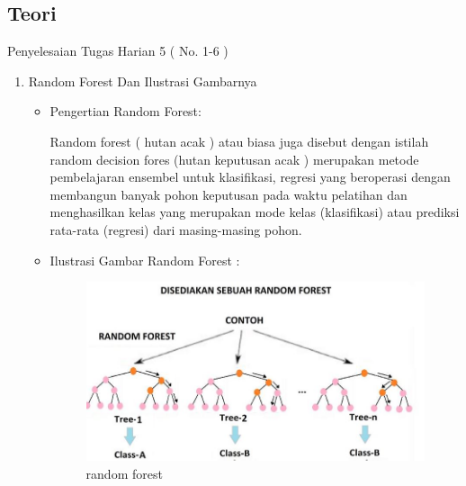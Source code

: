 \subsection{Teori}
Penyelesaian Tugas Harian 5 ( No. 1-6 )
\begin{enumerate}
\item Random Forest Dan Ilustrasi Gambarnya
\begin{itemize}
\item Pengertian Random Forest:
\par Random forest ( hutan acak ) atau biasa juga disebut dengan istilah random decision fores (hutan keputusan acak ) merupakan metode pembelajaran ensembel untuk klasifikasi, regresi yang beroperasi dengan membangun banyak pohon keputusan pada waktu pelatihan dan menghasilkan kelas yang merupakan mode kelas (klasifikasi) atau prediksi rata-rata (regresi) dari masing-masing pohon.
\item Ilustrasi Gambar Random Forest :
\par

\begin{figure}[ht]
\centering
\includegraphics[scale=0.2]{figures/random1.jpg}
\caption{random forest}
\label{contoh}
\end{figure}


\end{itemize}
\end{enumerate}
